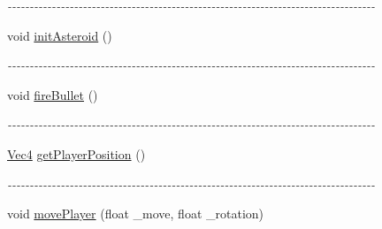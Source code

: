 \begin{DoxyCompactItemize}
\begin{DoxyCompactList}\small\item\em -\/-\/-\/-\/-\/-\/-\/-\/-\/-\/-\/-\/-\/-\/-\/-\/-\/-\/-\/-\/-\/-\/-\/-\/-\/-\/-\/-\/-\/-\/-\/-\/-\/-\/-\/-\/-\/-\/-\/-\/-\/-\/-\/-\/-\/-\/-\/-\/-\/-\/-\/-\/-\/-\/-\/-\/-\/-\/-\/-\/-\/-\/-\/-\/-\/-\/-\/-\/-\/-\/-\/-\/-\/-\/-\/-\/-\/-\/-\/-\/-\/-\/-\/ \item\end{DoxyCompactList}\item 
\hypertarget{classWorld_ae4f1190c2f18023f6ff60137df45a828}{
void \hyperlink{classWorld_ae4f1190c2f18023f6ff60137df45a828}{initAsteroid} ()}
\label{classWorld_ae4f1190c2f18023f6ff60137df45a828}

\begin{DoxyCompactList}\small\item\em -\/-\/-\/-\/-\/-\/-\/-\/-\/-\/-\/-\/-\/-\/-\/-\/-\/-\/-\/-\/-\/-\/-\/-\/-\/-\/-\/-\/-\/-\/-\/-\/-\/-\/-\/-\/-\/-\/-\/-\/-\/-\/-\/-\/-\/-\/-\/-\/-\/-\/-\/-\/-\/-\/-\/-\/-\/-\/-\/-\/-\/-\/-\/-\/-\/-\/-\/-\/-\/-\/-\/-\/-\/-\/-\/-\/-\/-\/-\/-\/-\/-\/-\/ \item\end{DoxyCompactList}\item 
\hypertarget{classWorld_a5f108203edbbb2961912e141ec682c5f}{
void \hyperlink{classWorld_a5f108203edbbb2961912e141ec682c5f}{fireBullet} ()}
\label{classWorld_a5f108203edbbb2961912e141ec682c5f}

\begin{DoxyCompactList}\small\item\em -\/-\/-\/-\/-\/-\/-\/-\/-\/-\/-\/-\/-\/-\/-\/-\/-\/-\/-\/-\/-\/-\/-\/-\/-\/-\/-\/-\/-\/-\/-\/-\/-\/-\/-\/-\/-\/-\/-\/-\/-\/-\/-\/-\/-\/-\/-\/-\/-\/-\/-\/-\/-\/-\/-\/-\/-\/-\/-\/-\/-\/-\/-\/-\/-\/-\/-\/-\/-\/-\/-\/-\/-\/-\/-\/-\/-\/-\/-\/-\/-\/-\/-\/ \item\end{DoxyCompactList}\item 
\hypertarget{classWorld_a78c368ac32e990b958c08e46a018ea31}{
\hyperlink{classVec4}{Vec4} \hyperlink{classWorld_a78c368ac32e990b958c08e46a018ea31}{getPlayerPosition} ()}
\label{classWorld_a78c368ac32e990b958c08e46a018ea31}

\begin{DoxyCompactList}\small\item\em -\/-\/-\/-\/-\/-\/-\/-\/-\/-\/-\/-\/-\/-\/-\/-\/-\/-\/-\/-\/-\/-\/-\/-\/-\/-\/-\/-\/-\/-\/-\/-\/-\/-\/-\/-\/-\/-\/-\/-\/-\/-\/-\/-\/-\/-\/-\/-\/-\/-\/-\/-\/-\/-\/-\/-\/-\/-\/-\/-\/-\/-\/-\/-\/-\/-\/-\/-\/-\/-\/-\/-\/-\/-\/-\/-\/-\/-\/-\/-\/-\/-\/-\/ \item\end{DoxyCompactList}\item 
\hypertarget{classWorld_add87dfe1862c8296e0734e11658adf4e}{
void \hyperlink{classWorld_add87dfe1862c8296e0734e11658adf4e}{movePlayer} (float \_\-move, float \_\-rotation)}
\label{classWorld_add87dfe1862c8296e0734e11658adf4e}


\end{DoxyCompactItemize}
